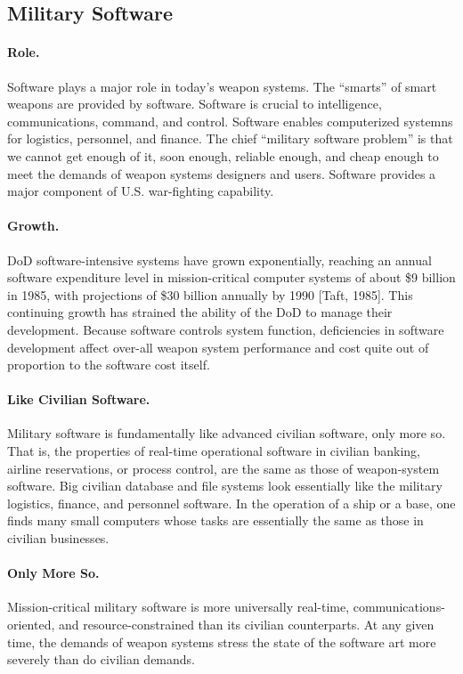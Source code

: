 \documentclass[11pt,final]{article}
\begin{document}
\subsection{Military Software}

\paragraph{Role.} Software plays a major role in today’s weapon systems. The
“smarts” of smart weapons are provided by software. Software is crucial to
intelligence, communications, command, and control. Software enables
computerized systemns for logistics, personnel, and finance. The chief
“military software problem” is that we cannot get enough of it, soon enough,
reliable enough, and cheap enough to meet the demands of weapon systems
designers and users. Software provides a major component of U.S. war-fighting
capability.

\paragraph{Growth.} DoD software-intensive systems have grown exponentially,
reaching an annual software expenditure level in mission-critical computer
systems of about \$9 billion in 1985, with projections of \$30 billion annually
by 1990 [Taft, 1985].  This continuing growth has strained the ability of the
DoD to manage their development. Because software controls system function,
deficiencies in software development affect over-all weapon system performance
and cost quite out of proportion to the software cost itself.

\paragraph{Like Civilian Software.} Military software is fundamentally like
advanced civilian software, only more so. That is, the properties of real-time
operational software in civilian banking, airline reservations, or process
control, are the same as those of weapon-system software. Big civilian
database and file systems look essentially like the military logistics,
finance, and personnel software. In the operation of a ship or a base, one
finds many small computers whose tasks are essentially the same as those in
civilian businesses.

\paragraph{Only More So.} Mission-critical military software is more
universally real-time, communications-oriented, and resource-constrained than
its civilian counterparts. At any given time, the demands of weapon systems
stress the state of the software art more severely than do civilian demands.
\end{document}
